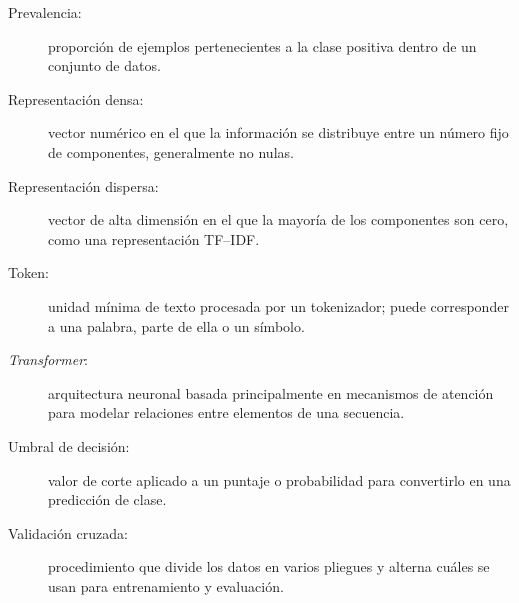 \begin{description}
  \item[Prevalencia:] proporción de ejemplos pertenecientes a la clase positiva dentro de un conjunto de datos.
  \item[Representación densa:] vector numérico en el que la información se distribuye entre un número fijo de componentes, generalmente no nulas.
  \item[Representación dispersa:] vector de alta dimensión en el que la mayoría de los componentes son cero, como una representación TF--IDF.
  \item[Token:] unidad mínima de texto procesada por un tokenizador; puede corresponder a una palabra, parte de ella o un símbolo.
  \item[\textit{Transformer}:] arquitectura neuronal basada principalmente en mecanismos de atención para modelar relaciones entre elementos de una secuencia.
  \item[Umbral de decisión:] valor de corte aplicado a un puntaje o probabilidad para convertirlo en una predicción de clase.
  \item[Validación cruzada:] procedimiento que divide los datos en varios pliegues y alterna cuáles se usan para entrenamiento y evaluación.
\end{description}
